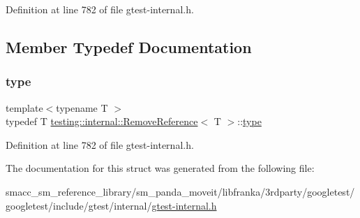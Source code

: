 Definition at line 782 of file gtest-\/internal.\+h.



\subsection{Member Typedef Documentation}
\mbox{\label{structtesting_1_1internal_1_1RemoveReference_a9ca4f6499579225f7986b789ee4b2895}} 
\subsubsection{\texorpdfstring{type}{type}}
{\footnotesize\ttfamily template$<$typename T $>$ \\
typedef T \hyperlink{structtesting_1_1internal_1_1RemoveReference}{testing\+::internal\+::\+Remove\+Reference}$<$ T $>$\+::\hyperlink{structtesting_1_1internal_1_1RemoveReference_a9ca4f6499579225f7986b789ee4b2895}{type}}



Definition at line 782 of file gtest-\/internal.\+h.



The documentation for this struct was generated from the following file\+:\begin{DoxyCompactItemize}
\item 
smacc\+\_\+sm\+\_\+reference\+\_\+library/sm\+\_\+panda\+\_\+moveit/libfranka/3rdparty/googletest/googletest/include/gtest/internal/\hyperlink{gtest-internal_8h}{gtest-\/internal.\+h}\end{DoxyCompactItemize}
